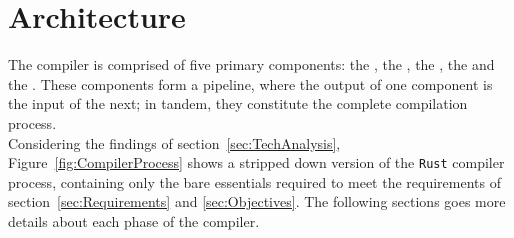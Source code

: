 \section{Architecture}
\label{sec:architecture}

The \lang{} compiler is comprised of five primary
components: the \lexer, the \parser, the \static, the \codeGen{} and the \gcc. These
components form a pipeline, where the output of one component is the input of the
next; in tandem, they constitute the complete compilation process. \\



Considering the findings of section~\ref{sec:TechAnalysis},
Figure~\ref{fig:CompilerProcess} shows a stripped down version of the \texttt{Rust}
compiler process, containing only the bare essentials required to meet the
requirements of section~\ref{sec:Requirements} and \ref{sec:Objectives}. The
following sections goes more details about each phase of the \lang{} compiler.






\newpage
